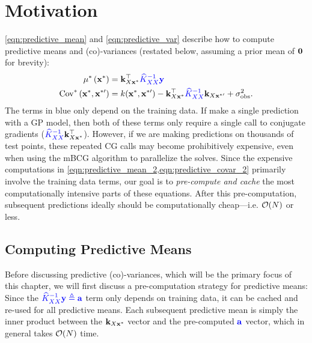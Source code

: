 \section{Motivation}
\label{sec:love_motivation}

\cref{eqn:predictive_mean} and \cref{eqn:predictive_var} describe how to compute predictive means and (co)-variances (restated below, assuming a prior mean of $\mathbf{0}$ for brevity):
%
\begin{align}
  \mu^* \left( \mathbf{x}^* \right)
  &= \mathbf{k}_{X \mathbf{x}^*}^\top {\color{blue} \ensuremath{\widehat{K}_{XX}}^{-1} \ensuremath{\mathbf{y}}}
  \label{eqn:predictive_mean_2}
  \\
  \text{Cov}^* \left( \mathbf{x}^*, \mathbf{x}^{*\prime} \right)
  &= k(\mathbf{x}^*, \mathbf{x}^{*\prime}) - \mathbf{k}_{X\mathbf{x}^*}^\top {\color{blue} \ensuremath{\widehat{K}_{XX}}^{-1}} \mathbf{k}_{X\mathbf{x}^{*\prime}} + \sigma^2_\text{obs}.
  \label{eqn:predictive_covar_2}
\end{align}
%
The terms in {\color{blue} blue} only depend on the training data.
If make a single prediction with a GP model, then both of these terms only require a single call to conjugate gradients (${\color{blue} \widehat{K}_{XX}^{-1}} \mathbf{k}^\top_{X\mathbf{x}^*}$).
However, if we are making predictions on thousands of test points, these repeated CG calls may become prohibitively expensive, even when using the mBCG algorithm to parallelize the solves.
Since the expensive computations in \cref{eqn:predictive_mean_2,eqn:predictive_covar_2} primarily involve the training data terms, our goal is to \emph{pre-compute and cache} the most computationally intensive parts of these equations.
After this pre-computation, subsequent predictions ideally should be computationally cheap---i.e. $\bigo{N}$ or less.

\subsection{Computing Predictive Means}
\label{sec:motivation_means}

Before discussing predictive (co)-variances, which will be the primary focus of this chapter, we will first discuss a pre-computation strategy for predictive means:
Since the ${\color{blue} \widehat{K}_{XX}^{-1} \mathbf{y} \triangleq \mathbf{a}}$ term only depends on training data, it can be cached and re-used for all predictive means.
Each subsequent predictive mean is simply the inner product between the $\mathbf{k}_{X \mathbf{x}^*}$ vector and the pre-computed $\color{blue} \mathbf{a}$ vector, which in general takes $\bigo{N}$ time.

